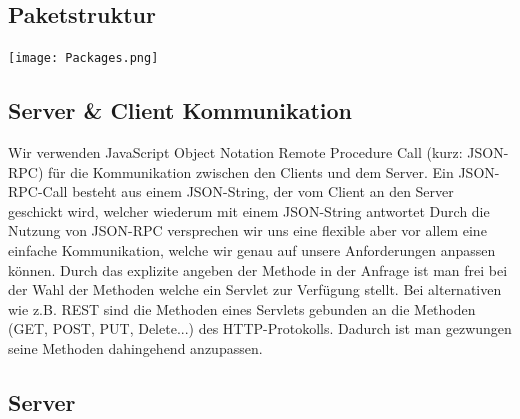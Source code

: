 	\subsection{Paketstruktur}
	 \texttt{[image: Packages.png]}
	\subsection{Server \& Client Kommunikation}

	Wir verwenden JavaScript Object Notation Remote Procedure Call (kurz: JSON-RPC) für die Kommunikation zwischen den Clients und dem Server.
	Ein JSON-RPC-Call besteht aus einem JSON-String, der vom Client an den Server geschickt wird, welcher wiederum mit einem JSON-String antwortet
	Durch die Nutzung von JSON-RPC versprechen wir uns eine flexible aber vor allem eine einfache Kommunikation, welche wir genau auf unsere Anforderungen anpassen können.
Durch das explizite angeben der Methode in der Anfrage ist man frei bei der Wahl der Methoden welche ein Servlet zur Verfügung stellt. Bei alternativen wie z.B. REST sind die Methoden eines Servlets gebunden an die Methoden (GET, POST, PUT, Delete...) des HTTP-Protokolls. Dadurch ist man gezwungen seine Methoden dahingehend anzupassen.

	
	\subsection{Server}
